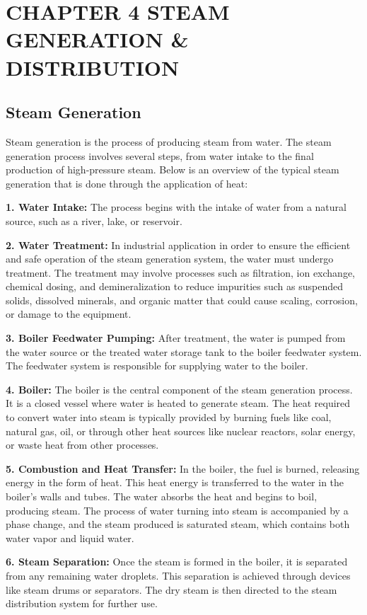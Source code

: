 \section{CHAPTER 4 STEAM GENERATION \& DISTRIBUTION}
\subsection{Steam Generation}
Steam generation is the process of producing steam from water. The steam generation process involves several steps, from water intake to the final production of high-pressure steam. Below is an overview of the typical steam generation that is done through the application of heat:

\textbf{1. Water Intake:} The process begins with the intake of water from a natural source, such as a river, lake, or reservoir. 

\textbf{2. Water Treatment:} In industrial application in order to ensure the efficient and safe operation of the steam generation system, the water must undergo treatment. The treatment may involve processes such as filtration, ion exchange, chemical dosing, and demineralization to reduce impurities such as suspended solids, dissolved minerals, and organic matter that could cause scaling, corrosion, or damage to the equipment.

\textbf{3. Boiler Feedwater Pumping:} After treatment, the water is pumped from the water source or the treated water storage tank to the boiler feedwater system. The feedwater system is responsible for supplying water to the boiler.

\textbf{4. Boiler:} The boiler is the central component of the steam generation process. It is a closed vessel where water is heated to generate steam. The heat required to convert water into steam is typically provided by burning fuels like coal, natural gas, oil, or through other heat sources like nuclear reactors, solar energy, or waste heat from other processes.

\textbf{5. Combustion and Heat Transfer:} In the boiler, the fuel is burned, releasing energy in the form of heat. This heat energy is transferred to the water in the boiler's walls and tubes. The water absorbs the heat and begins to boil, producing steam. The process of water turning into steam is accompanied by a phase change, and the steam produced is saturated steam, which contains both water vapor and liquid water.

\textbf{6. Steam Separation:} Once the steam is formed in the boiler, it is separated from any remaining water droplets. This separation is achieved through devices like steam drums or separators. The dry steam is then directed to the steam distribution system for further use.

